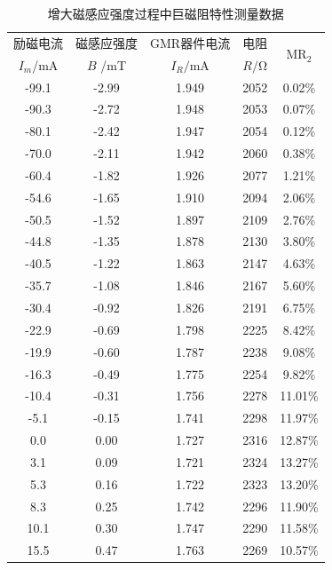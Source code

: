 \documentclass{thuemp}
\begin{document}
\begin{itemize}
\begin{table}[H]
    \centering
    \captionnamefont{\wuhao\bf\heiti}
    \captiontitlefont{\wuhao\bf\heiti}
    \caption{增大磁感应强度过程中巨磁阻特性测量数据} \label{tab:magnetoresistance_incr}
    \liuhao
    \begin{tabular}{ccccc}
        \toprule
        励磁电流 & 磁感应强度 & GMR器件电流 & 电阻 & \multirow{2}{*}{$\mathrm{MR_2}$}\\
        $I_m$/\si{\milli\ampere} & $B$ /\si{\milli\tesla} & $I_R$$ /\si{\milli\ampere}$ & $R$$/\si{\ohm} $& \\
        \midrule
        -99.1  & -2.99 & 1.949 & 2052 & 0.02\%  \\
        -90.3  & -2.72 & 1.948 & 2053 & 0.07\%  \\
        -80.1  & -2.42 & 1.947 & 2054 & 0.12\%  \\
        -70.0  & -2.11 & 1.942 & 2060 & 0.38\%  \\
        -60.4  & -1.82 & 1.926 & 2077 & 1.21\%  \\
        -54.6  & -1.65 & 1.910 & 2094 & 2.06\%  \\
        -50.5  & -1.52 & 1.897 & 2109 & 2.76\%  \\
        -44.8  & -1.35 & 1.878 & 2130 & 3.80\%  \\
        -40.5  & -1.22 & 1.863 & 2147 & 4.63\%  \\
        -35.7  & -1.08 & 1.846 & 2167 & 5.60\%  \\
        -30.4  & -0.92 & 1.826 & 2191 & 6.75\%  \\
        -22.9  & -0.69 & 1.798 & 2225 & 8.42\%  \\
        -19.9  & -0.60 & 1.787 & 2238 & 9.08\%  \\
        -16.3  & -0.49 & 1.775 & 2254 & 9.82\%  \\
        -10.4  & -0.31 & 1.756 & 2278 & 11.01\% \\
        -5.1   & -0.15 & 1.741 & 2298 & 11.97\% \\
        0.0    & 0.00  & 1.727 & 2316 & 12.87\% \\
        3.1    & 0.09  & 1.721 & 2324 & 13.27\% \\
        5.3    & 0.16  & 1.722 & 2323 & 13.20\% \\
        8.3    & 0.25  & 1.742 & 2296 & 11.90\% \\
        10.1   & 0.30  & 1.747 & 2290 & 11.58\% \\
        15.5   & 0.47  & 1.763 & 2269 & 10.57\% \\

\end{tabular}
\end{table}
\end{itemize}
\end{document}
